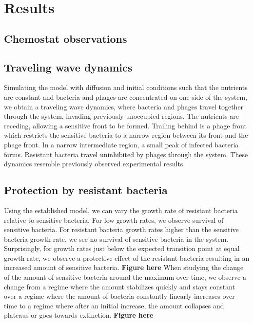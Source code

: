\chapter{Results}
\label{chap:phages_results}

\section{Chemostat observations}

\section{Traveling wave dynamics}
Simulating the model with diffusion and initial conditions such that the nutrients are constant and bacteria and phages are concentrated on one side of the system, we obtain a traveling wave dynamics, where bacteria and phages travel together through the system, invading previously unoccupied regions. The nutrients are receding, allowing a sensitive front to be formed. Trailing behind is a phage front which restricts the sensitive bacteria to a narrow region between its front and the phage front. In a narrow intermediate region, a small peak of infected bacteria forms. Resistant bacteria travel uninhibited by phages through the system. These dynamics resemble previously observed experimental results. 
\section{Protection by resistant bacteria}
Using the established model, we can vary the growth rate of resistant bacteria relative to sensitive bacteria. For low growth rates, we observe survival of sensitive bacteria. For resistant bacteria growth rates higher than the sensitive bacteria growth rate, we see no survival of sensitive bacteria in the system. Surprisingly, for growth rates just below the expected transition point at equal growth rate, we observe a protective effect of the resistant bacteria resulting in an increased amount of sensitive bacteria. \textbf{Figure here} When studying the change of the amount of sensitive bacteria around the maximum over time, we observe a change from a regime where the amount stabilizes quickly and stays constant over a regime where the amount of bacteria constantly linearly increases over time to a regime where after an initial increase, the amount collapses and plateaus or goes towards extinction. \textbf{Figure here} 
